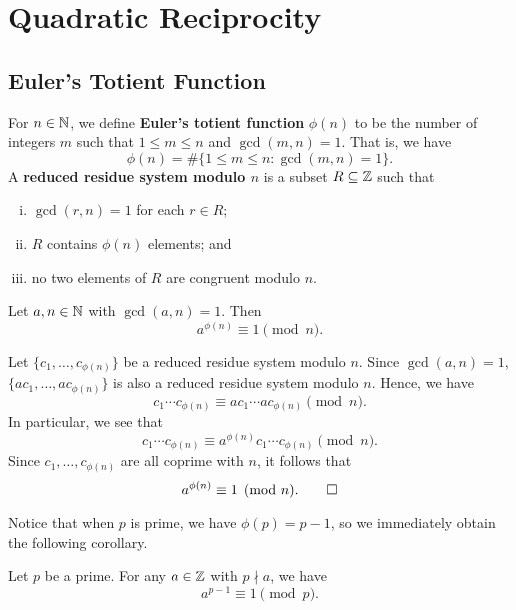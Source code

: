 \section{Quadratic Reciprocity}\label{sec:5}

\subsection{Euler's Totient Function}\label{subsec:5.1}

\begin{defn}\label{def:5.1}
    For $n \in \mathbb{N}$, we define {\bf Euler's totient function} $\phi(n)$ to be 
    the number of integers $m$ such that $1 \leq m \leq n$ and $\gcd(m, n) = 1$. 
    That is, we have 
    \[ \phi(n) = \#\{1 \leq m \leq n : \gcd(m, n) = 1\}. \] 
    A {\bf reduced residue system modulo $n$} is a subset $R \subseteq \mathbb{Z}$ such that 
    \begin{enumerate}[(i)]
        \item $\gcd(r, n) = 1$ for each $r \in R$; 
        \item $R$ contains $\phi(n)$ elements; and 
        \item no two elements of $R$ are congruent modulo $n$. 
    \end{enumerate}
\end{defn}

\begin{thm}\label{thm:5.2}
    Let $a, n \in \mathbb{N}$ with $\gcd(a, n) = 1$. Then 
    \[ a^{\phi(n)} \equiv 1 \pmod n. \] 
\end{thm}
\begin{pf}
    Let $\{c_1, \dots, c_{\phi(n)}\}$ be a reduced residue system modulo $n$. 
    Since $\gcd(a, n) = 1$, $\{ac_1, \dots, ac_{\phi(n)}\}$ is also a 
    reduced residue system modulo $n$. Hence, we have 
    \[ c_1 \cdots c_{\phi(n)} \equiv ac_1 \cdots ac_{\phi(n)} \pmod n. \] 
    In particular, we see that 
    \[ c_1 \cdots c_{\phi(n)} \equiv a^{\phi(n)} c_1 \cdots c_{\phi(n)} \pmod n. \] 
    Since $c_1, \dots, c_{\phi(n)}$ are all coprime with $n$, it follows that 
    \[ a^{\phi(n)} \equiv 1 \pmod n. \qedhere \] 
\end{pf}

Notice that when $p$ is prime, we have $\phi(p) = p-1$, so we immediately 
obtain the following corollary. 

\begin{cor}\label{cor:5.3}
    Let $p$ be a prime. For any $a \in \mathbb{Z}$ with $p \nmid a$, we have 
    \[ a^{p-1} \equiv 1 \pmod p. \] 
\end{cor}

